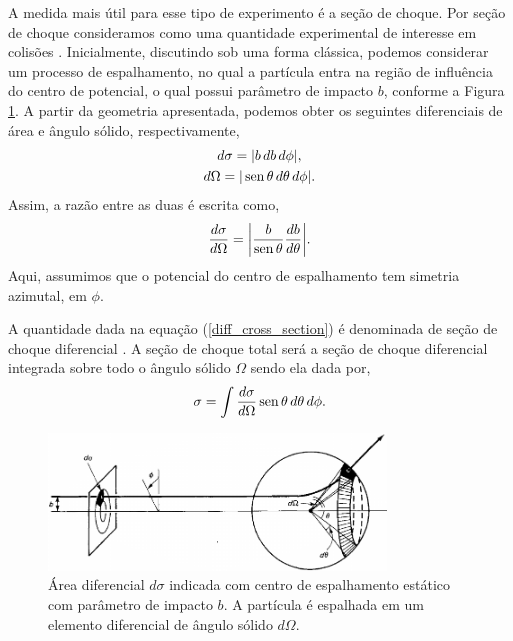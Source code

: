 A medida mais útil para esse tipo de experimento é a seção de choque.  Por
seção de choque consideramos como uma quantidade experimental de interesse em
colisões \cite{griffiths_particle}.  Inicialmente, discutindo sob uma forma
clássica, podemos considerar um processo de espalhamento, no qual a partícula
entra na região de influência do centro de potencial, o qual possui parâmetro
de impacto $b$, conforme a Figura \ref{cross_section_def}. A partir da
geometria apresentada, podemos obter os seguintes diferenciais de área e ângulo
sólido, respectivamente,
\begin{gather}
d\sigma = |b\, db\, d\phi|,\\
d\Omega = |\operatorname*{sen} \theta \, d\theta \, d\phi|.
\end{gather}
Assim, a razão entre as duas é escrita como,
\begin{equation}
\frac{d\sigma}{d\Omega} = \bigg| \frac{b}{\operatorname*{sen} \theta} \frac{db}{d\theta}
\bigg|. \label{diff_cross_section}
\end{equation}
Aqui, assumimos que o potencial do centro de espalhamento tem simetria
azimutal, em $\phi$.

A quantidade dada na equação (\ref{diff_cross_section}) é denominada de seção
de choque diferencial \cite{griffiths_particle}.  A seção de choque total
será a seção de choque diferencial integrada sobre todo o ângulo sólido
$\Omega$ sendo ela dada por,
\begin{equation}
\sigma = \int \frac{d\sigma}{d\Omega} \operatorname*{sen} \theta \, d\theta \, d\phi .
\end{equation}

\begin{figure}[h]
\centering
	\captionsetup{width=0.8\textwidth}
	\caption{Área diferencial $d\sigma$ indicada com centro de espalhamento
	estático com parâmetro de impacto $b$. A partícula é espalhada em um
	elemento diferencial de ângulo sólido $d\Omega$.}
\label{cross_section_def}
\includegraphics[width=0.8\textwidth]{./figs/cross_section.jpeg}
\end{figure}

